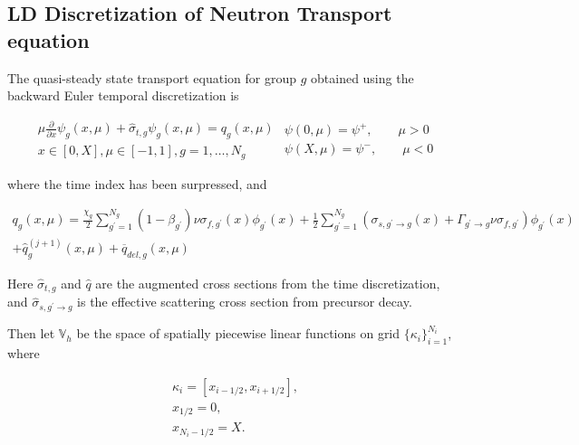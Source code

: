 \documentclass{proposal}
\newcommand{\ddx}{\ensuremath{\frac{\partial}{\partial x}}}
\newcommand{\p}{\ensuremath{^\prime}}
\newcommand{\rarr}{\ensuremath{\rightarrow}}
\begin{document}
\begin{appendices}

\section{LD Discretization of Neutron Transport equation}\label{sec:LD-transport}

The quasi-steady state transport equation for group $g$ obtained using the backward Euler temporal discretization is

\begin{subequations}
    \begin{multline}
        \mu \ddx \psi_g(x, \mu) + \hat{\sigma}_{t, g}\psi_g(x, \mu) = q_g(x, \mu)\\
         x \in [0, X], \mu \in [-1, 1], g = 1, \dots, N_g
    \end{multline}
    \begin{gather}
        \psi(0, \mu) = \psi^+, \qquad \mu > 0\\
        \psi(X, \mu) = \psi^-, \qquad \mu < 0
    \end{gather}
    
\end{subequations}

where the time index has been surpressed, and 

\begin{multline}
    q_g(x, \mu) = \frac{\chi_g}{2}\sum_{g\p = 1}^{N_g} (1- \beta_{g\p})\nu\sigma_{f, g\p}(x) \phi_{g\p}(x) + \frac{1}{2}\sum_{g\p = 1}^{N_g} \left(\sigma_{s, g\p \rarr g}(x) + {\Gamma}_{g\p\rarr g} \nu \sigma_{f, g\p} \right)\phi_{g\p}(x)\\
          +\hat{q}^{(j+1)}_{g}(x, \mu)+ \overline{q}_{del, g}(x, \mu)
\end{multline}

Here $\hat{\sigma}_{t, g}$ and $\hat{q}$ are the augmented cross sections from the time discretization, and $\hat{\sigma}_{s, g\p \rarr g}$ is the effective scattering cross section from precursor decay.

Then let $\mathbb{V}_h$ be the space of spatially piecewise linear functions on grid $\{\kappa_i \}_{i=1}^{N_i}$, where

\begin{gather}
    \kappa_i = [x_{i-1/2}, x_{i+1/2}],\\
    x_{1/2} = 0,\\
    x_{N_i - 1/2} = X.
\end{gather}


\end{appendices}
\end{document}
